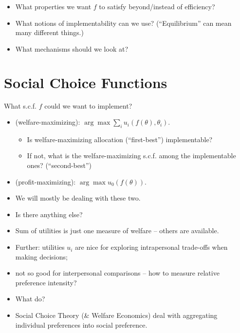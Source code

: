\documentclass[english,handout,10pt]{beamer}		%
\def\lyxframeend{} %
\begin{document}
\begin{itemize}
	\item What properties we want $f$ to satisfy beyond/instead of efficiency?
	\item What notions of implementability can we use? (``Equilibrium'' can mean many different things.)
	\item What mechanisms should we look at?
\end{itemize}
\lyxframeend





\section{Social Choice Functions}


What s.c.f. $f$ could we want to implement?
\begin{itemize}
	\item {} (welfare-maximizing): $\arg \max \sum_i u_i(f(\theta),\theta_i)$.
	\begin{itemize}
		\item Is welfare-maximizing allocation (``first-best'') implementable?
		\item If not, what is the welfare-maximizing s.c.f. among the implementable ones? (``second-best'')
	\end{itemize}
	\pause
	\item {} (profit-maximizing): $\arg \max u_0(f(\theta))$.
	\pause
	\item We will mostly be dealing with these two.
	\item Is there anything else?
\end{itemize}
\lyxframeend


\begin{itemize}
	\item Sum of utilities is just one measure of welfare -- others are available.
	\item Further: utilities $u_i$ are nice for exploring intrapersonal trade-offs when making decisions;
	\item not so good for interpersonal comparisons -- how to measure relative preference intensity?
	\item What do?
	\pause
	\item Social Choice Theory (\& Welfare Economics) deal with aggregating individual preferences into social preference.
\end{itemize}
\lyxframeend
\end{document}
